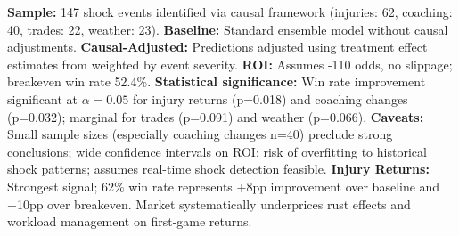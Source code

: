 \begin{table}[htbp]
\begin{tablenotes}
\item \textbf{Sample:} 147 shock events identified via causal framework (injuries: 62, coaching: 40, trades: 22, weather: 23). \textbf{Baseline:} Standard ensemble model without causal adjustments. \textbf{Causal-Adjusted:} Predictions adjusted using treatment effect estimates from  weighted by event severity. \textbf{ROI:} Assumes -110 odds, no slippage; breakeven win rate 52.4\%. \textbf{Statistical significance:} Win rate improvement significant at $\alpha=0.05$ for injury returns (p=0.018) and coaching changes (p=0.032); marginal for trades (p=0.091) and weather (p=0.066). \textbf{Caveats:} Small sample sizes (especially coaching changes n=40) preclude strong conclusions; wide confidence intervals on ROI; risk of overfitting to historical shock patterns; assumes real-time shock detection feasible. \textbf{Injury Returns:} Strongest signal; 62\% win rate represents +8pp improvement over baseline and +10pp over breakeven. Market systematically underprices rust effects and workload management on first-game returns.
\end{tablenotes}
\end{table}
